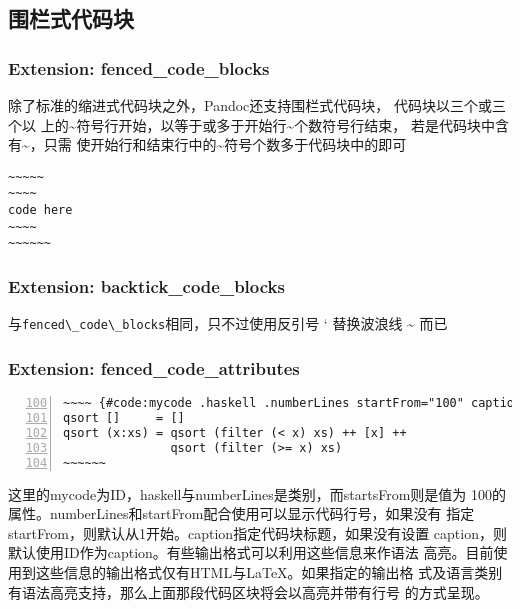 \documentclass[cn]{elegantbook}
\newcommand{\passthrough}[1]{#1}
\begin{document}
\hypertarget{ux56f4ux680fux5f0fux4ee3ux7801ux5757}{%
\subsection{围栏式代码块}\label{ux56f4ux680fux5f0fux4ee3ux7801ux5757}}

\hypertarget{extension-fenced_code_blocks}{%
\subsubsection{Extension:
fenced\_code\_blocks}\label{extension-fenced_code_blocks}}

除了标准的缩进式代码块之外，Pandoc还支持围栏式代码块，
代码块以三个或三个以
上的\textasciitilde 符号行开始，以等于或多于开始行\textasciitilde 个数符号行结束，
若是代码块中含有\textasciitilde，只需
使开始行和结束行中的\textasciitilde 符号个数多于代码块中的即可

\begin{lstlisting}
~~~~~
~~~~
code here
~~~~
~~~~~~
\end{lstlisting}

\hypertarget{extension-backtick_code_blocks}{%
\subsubsection{Extension:
backtick\_code\_blocks}\label{extension-backtick_code_blocks}}

与\passthrough{\lstinline!fenced\_code\_blocks!}相同，只不过使用反引号 `
替换波浪线 \textasciitilde{} 而已

\hypertarget{extension-fenced_code_attributes}{%
\subsubsection{Extension:
fenced\_code\_attributes}\label{extension-fenced_code_attributes}}

\begin{lstlisting}[numbers=left, firstnumber=100, caption=围栏式代码块, label=code:fencedcode, float=htbp]
~~~~ {#code:mycode .haskell .numberLines startFrom="100" caption="围栏式代码块"}
qsort []     = []
qsort (x:xs) = qsort (filter (< x) xs) ++ [x] ++
               qsort (filter (>= x) xs)
~~~~~~
\end{lstlisting}

这里的mycode为ID，haskell与numberLines是类别，而startsFrom则是值为
100的属性。numberLines和startFrom配合使用可以显示代码行号，如果没有
指定startFrom，则默认从1开始。caption指定代码块标题，如果没有设置
caption，则默认使用ID作为caption。有些输出格式可以利用这些信息来作语法
高亮。目前使用到这些信息的输出格式仅有HTML与LaTeX。如果指定的输出格
式及语言类别有语法高亮支持，那么上面那段代码区块将会以高亮并带有行号
的方式呈现。
\end{document}

